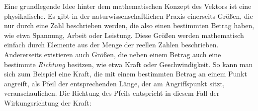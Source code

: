 
\Mtikzexternalize




\begin{MSectionStart}

\MModstartBox
\end{MSectionStart}


\begin{MIntro}
Eine grundlegende Idee hinter dem mathematischen Konzept des Vektors ist eine physikalische. Es gibt in der naturwissenschaftlichen Praxis einerseits Größen, die nur durch eine Zahl beschrieben werden, die also einen bestimmten Betrag haben, wie etwa Spannung, Arbeit oder Leistung. Diese Größen werden mathematisch einfach durch Elemente aus der Menge der reellen Zahlen beschrieben. Andererseits existieren auch Größen, die neben einem Betrag auch eine bestimmte \textit{Richtung} besitzen, wie etwa Kraft oder Geschwindigkeit. So kann man sich zum Beispiel eine Kraft, die mit einem bestimmten Betrag an einem Punkt angreift, als Pfeil der entsprechenden Länge, der am Angriffspunkt sitzt, veranschaulichen. Die Richtung des Pfeils entspricht in diesem Fall der Wirkungsrichtung der Kraft:

\begin{center}
%
\end{center}


\end{MIntro}
